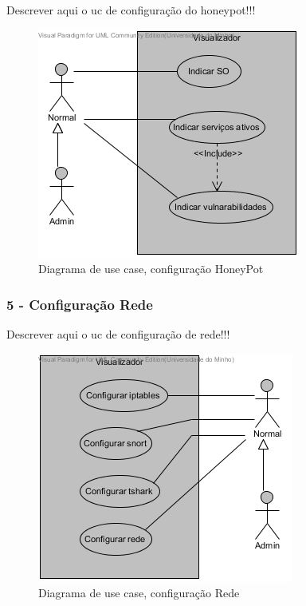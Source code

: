 Descrever aqui o uc de configuração do honeypot!!!

\begin{figure}[!htb]
	\centering
	\includegraphics[scale=0.80]{images/ucs/ConfHoneyPot}
	\caption {Diagrama de use case, configuração HoneyPot}
\end{figure}
\pagebreak

\subsubsection{\textbf{5 - Configuração Rede}}

Descrever aqui o uc de configuração de rede!!!

\begin{figure}[!htb]
	\centering
	\includegraphics[scale=0.80]{images/ucs/ConfRede}
	\caption {Diagrama de use case, configuração Rede}
\end{figure}
\pagebreak

